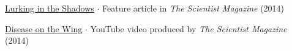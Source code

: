 \documentclass{cv}
\begin{document}
\href{https://www.the-scientist.com/features/lurking-in-the-shadows-36302}{Lurking in the Shadows} $\cdot$ Feature article in \textit{The Scientist Magazine} (2014)

\href{https://youtu.be/p6I0kRVGyo4}{Disease on the Wing} $\cdot$ YouTube video produced by \textit{The Scientist Magazine} (2014)







\end{document}
